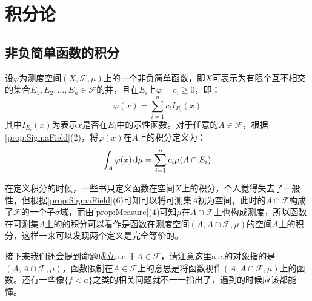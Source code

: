 \section{积分论}

\subsection{非负简单函数的积分}
\begin{definition}
	设$\varphi$为测度空间$(X,\mathscr{F},\mu)$上的一个非负简单函数，即$X$可表示为有限个互不相交的集合$E_1,E_2,\dots,E_n\in \mathscr{F}$的并，且在$E_i$上$\varphi=c_i\geqslant0$，即：
	\begin{equation*}
		\varphi(x)=\sum_{i=1}^{n}c_iI_{E_i}(x)
	\end{equation*}
	其中$I_{E_i}(x)$为表示$x$是否在$E_i$中的示性函数。对于任意的$A\in \mathscr{F}$，根据\cref{prop:SigmaField}(2)，将$\varphi(x)$在$A$上的积分定义为：
	\begin{equation*}
		\int_{A}\varphi(x)\mathop{}\!\mathrm{d}\mu=\sum_{i=1}^{n}c_i\mu(A\cap E_i)
	\end{equation*}
\end{definition}
\begin{note}
	在定义积分的时候，一些书只定义函数在空间$X$上的积分，个人觉得失去了一般性，但根据\cref{prop:SigmaField}(6)可知可以将可测集$A$视为空间，此时的$A\cap\mathscr{F}$构成了$\mathscr{F}$的一个子$\sigma$域，而由\cref{prop:Measure}(4)可知$\mu$在$A\cap\mathscr{F}$上也构成测度，所以函数在可测集$A$上的的积分可以看作是函数在测度空间$(A,A\cap\mathscr{F},\mu)$的空间$A$上的积分，这样一来可以发现两个定义是完全等价的。\par
	接下来我们还会提到命题成立a.e.于$A\in\mathscr{F}$，请注意这里a.e.的对象指的是$(A,A\cap\mathscr{F},\mu)$，函数限制在$A\in\mathscr{F}$上的意思是将函数视作$(A,A\cap\mathscr{F},\mu)$上的函数。还有一些像$\{f<a\}$之类的相关问题就不一一指出了，遇到的时候应该都能懂。
\end{note}

